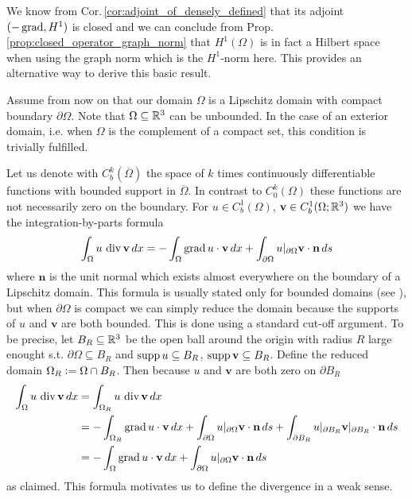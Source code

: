 \documentclass[../master_thesis.tex]{subfiles}
\begin{document}
We know from Cor.\,\ref{cor:adjoint_of_densely_defined} 
that its adjoint $(-\operatorname{grad}, H^1)$ is closed and 
we can conclude from Prop.\,\ref{prop:closed_operator_graph_norm} 
that $H^1(\Omega)$ is in fact a Hilbert space 
when using the graph norm which is the $H^1$-norm here. This provides an alternative 
way to derive this basic result.

Assume from now on that our domain $\Omega$ is a Lipschitz domain 
with compact boundary $\partial \Omega$. Note that $\Omega \subseteq \mathbb{R}^3$ 
can be unbounded. In the case of an exterior domain, i.e. when $\Omega$ is 
the complement of a compact set, this condition is trivially fulfilled.

Let us denote with $C^k_b(\overline{\Omega})$ the space of $k$ times continuously
differentiable functions with bounded support in $\overline{\Omega}$. 
In contrast to $C^k_0(\Omega)$ these functions are not necessarily zero on the 
boundary.
For $u \in C_b^1(\Omega)$, $\mathbf{v} \in C_b^1(\Omega;\mathbb{R}^3)$ we 
have the integration-by-parts formula
\begin{align}
    \int_\Omega u \, \operatorname{div} \mathbf{v} \, dx
    = - \int_\Omega \operatorname{grad} u \cdot \mathbf{v} \, dx
        + \int_{\partial \Omega} u|_{\partial \Omega} \mathbf{v}\cdot\mathbf{n} \, ds
        \label{eq:integration_by_parts_C1}
\end{align}
where $\mathbf{n}$ is the unit normal which exists almost everywhere on the boundary of a 
Lipschitz domain. This formula is usually stated only for 
bounded domains (see \cite[Cor.\,3.20]{monk}), but when $\partial \Omega$ is compact 
we can simply reduce the domain 
because the supports of $u$ and $\mathbf{v}$ are both bounded. This is done using 
a standard cut-off argument.
To be precise, let $B_R \subseteq \mathbb{R}^3$ be the open ball around the origin 
with radius $R$ large enought s.t. $\partial \Omega \subseteq B_R$ and 
$\operatorname{supp} u \subseteq B_R$, $\operatorname{supp} \mathbf{v} \subseteq B_R$.
Define the reduced domain $\Omega_R \vcentcolon= \Omega \cap B_R$. 
Then because $u$ and $\mathbf{v}$ are both zero on $\partial B_R$
\begin{align*}
    \int_\Omega u \, \operatorname{div} \mathbf{v} \, dx
    &= \int_{\Omega_R} u \, \operatorname{div} \mathbf{v} \, dx
    \\ &= - \int_{\Omega_R} \operatorname{grad} u \cdot \mathbf{v} \, dx
        + \int_{\partial \Omega} u|_{\partial \Omega} \mathbf{v}\cdot\mathbf{n} \, ds
        + \int_{\partial B_R} u|_{\partial B_R} \mathbf{v}|_{\partial B_R} \cdot\mathbf{n} \, ds
    \\ &= - \int_\Omega \operatorname{grad} u \cdot \mathbf{v} \, dx
        + \int_{\partial \Omega} u|_{\partial \Omega} \mathbf{v}\cdot\mathbf{n} \, ds
\end{align*}
as claimed. This formula motivates us to define the divergence in a
weak sense.
\end{document}
